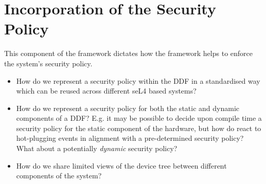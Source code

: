 \documentclass[a4paper,12pt]{report}
\begin{document}

\section{Incorporation of the Security Policy}

This component of the framework dictates how the framework helps to
enforce the system's security policy.

\begin{itemize}
\item How do we represent a security policy within the DDF in
  a standardised way which can be reused across different seL4
  based systems?
\item How do we represent a security policy for both the
  static and dynamic components of a DDF? E.g. it may be
  possible to decide upon compile time a security policy for
  the static component of the hardware, but how do react to
  hot-plugging events in alignment with a pre-determined
  security policy? What about a potentially \textit{dynamic}
  security policy?
\item How do we share limited views of the device tree between
  different components of the system?
\end{itemize}
\end{document}
